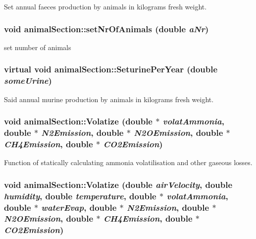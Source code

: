 Set annual faeces production by animals in kilograms fresh weight. \hypertarget{classanimal_section_afeb3c65b7f3a7e96d71294a84ac68651}{
\subsubsection[{setNrOfAnimals}]{\setlength{\rightskip}{0pt plus 5cm}void animalSection::setNrOfAnimals (double {\em aNr})}}
\label{classanimal_section_afeb3c65b7f3a7e96d71294a84ac68651}


set number of animals \hypertarget{classanimal_section_ab571a85500e0c5454cd77b7787739d5f}{
\subsubsection[{SeturinePerYear}]{\setlength{\rightskip}{0pt plus 5cm}virtual void animalSection::SeturinePerYear (double {\em someUrine})}}
\label{classanimal_section_ab571a85500e0c5454cd77b7787739d5f}


Said annual murine production by animals in kilograms fresh weight. \hypertarget{classanimal_section_a71d57784567fc97647e2b7d4c98bb6d6}{
\subsubsection[{Volatize}]{\setlength{\rightskip}{0pt plus 5cm}void animalSection::Volatize (double $\ast$ {\em volatAmmonia}, \/  double $\ast$ {\em N2Emission}, \/  double $\ast$ {\em N2OEmission}, \/  double $\ast$ {\em CH4Emission}, \/  double $\ast$ {\em CO2Emission})}}
\label{classanimal_section_a71d57784567fc97647e2b7d4c98bb6d6}


Function of statically calculating ammonia volatilisation and other gaseous losses. \hypertarget{classanimal_section_a6d35029ed226599d557f1bf61b9100c3}{
\subsubsection[{Volatize}]{\setlength{\rightskip}{0pt plus 5cm}void animalSection::Volatize (double {\em airVelocity}, \/  double {\em humidity}, \/  double {\em temperature}, \/  double $\ast$ {\em volatAmmonia}, \/  double $\ast$ {\em waterEvap}, \/  double $\ast$ {\em N2Emission}, \/  double $\ast$ {\em N2OEmission}, \/  double $\ast$ {\em CH4Emission}, \/  double $\ast$ {\em CO2Emission})}}
\label{classanimal_section_a6d35029ed226599d557f1bf61b9100c3}


